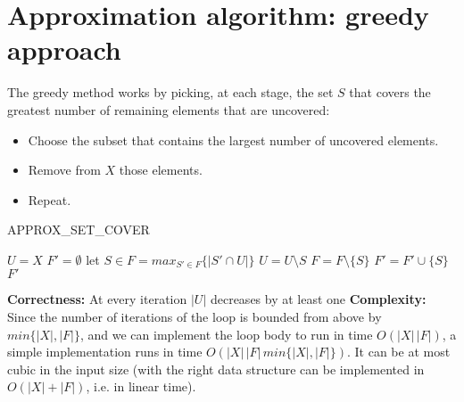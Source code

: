 \section{Approximation algorithm: greedy approach}
The greedy method works by picking, at each stage, the set $S$ that covers the greatest number of remaining elements that are uncovered:
\begin{itemize}
    \item Choose the subset that contains the largest number of uncovered elements.

    \item  Remove from $X$ those elements.

    \item  Repeat.
\end{itemize}
\begin{algorithm}
\caption{APPROX\_SET\_COVER}\label{APPROXSETCOVER}
    \begin{algorithmic}[1]
        \State $U = X$
        \State $F' = \emptyset$
            \State let $S \in F = max_{S' \in F}\{|S' \cap U|\}$
            \State $U = U \setminus S$
            \State $F = F \setminus \{S\}$
            \State $F' = F' \cup \{S\}$
        \EndWhile
        \Return $F'$
    \EndProcedure   
    \end{algorithmic}
\end{algorithm}
\textbf{Correctness:} At every iteration $|U|$ decreases by at least one\newline\newline
\textbf{Complexity:} Since the number of iterations of the loop is bounded from above by $min\{|X|, |F|\}$, and we can implement the loop body to run in time $O(|X|\,|F|)$, a simple implementation runs in time $O(|X|\,|F|\,min\{|X|, |F|\})$. It can be at most cubic in the input size (with the right data structure can be implemented in $O(|X| + |F|)$, i.e. in linear time).

